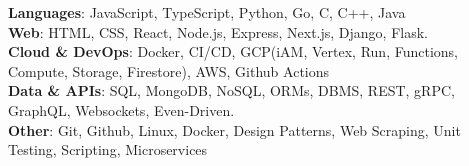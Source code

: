 \documentclass[10pt, letterpaper]{article}
\begin{document}
\textbf{Languages}{: JavaScript, TypeScript, Python, Go, C, C++, Java} \\ \vspace{0.2 cm}
\textbf{Web}{:  HTML, CSS, React, Node.js, Express, Next.js, Django, Flask.} \\ \vspace{0.2 cm}
\textbf{Cloud \& DevOps}{: Docker, CI/CD, GCP(iAM, Vertex, Run, Functions, Compute, Storage, Firestore), AWS, Github Actions} \\ \vspace{0.2 cm}
\textbf{Data \& APIs}{: SQL, MongoDB, NoSQL, ORMs, DBMS, REST, gRPC, GraphQL, Websockets, Even-Driven.} \\ \vspace{0.2 cm}
\textbf{Other}{: Git, Github, Linux, Docker, Design Patterns, Web Scraping, Unit Testing, Scripting, Microservices} \\ \vspace{0.2 cm}
\end{document}
